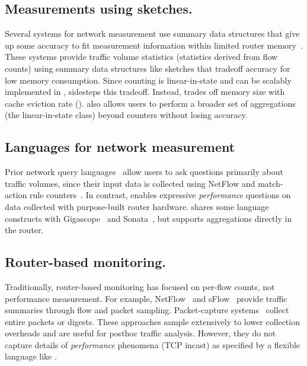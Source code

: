 \subsection{Measurements using sketches.} Several systems for network
measurement use summary data structures that give up some accuracy to fit
measurement information within limited router memory~\cite{univmon, flowradar,
counterbraids, dream, progme, opensketch}. These systems provide traffic volume
statistics (\ie statistics derived from flow counts) using summary data
structures like sketches that tradeoff accuracy for low memory consumption.
Since counting is linear-in-state and can be scalably implemented in
\TheSystem, \TheSystem sidesteps this tradeoff. Instead, \TheSystem trades off
memory size with cache eviction rate ().  \TheSystem also allows
users to perform a broader set of aggregations (the linear-in-state class)
beyond counters without losing accuracy.

\subsection{Languages for network measurement} Prior network query
languages~\cite{gigascope, frenetic, path_query, streaming-monitoring} allow
users to ask questions primarily about traffic volumes, since their input data
is collected using NetFlow and match-action rule counters~\cite{openflow}. In
contrast, \TheSystem enables expressive {\em performance} questions on data
collected with purpose-built router hardware. \TheSystem shares some language
constructs with Gigascope~\cite{gigascope} and
Sonata~\cite{streaming-monitoring}, but supports aggregations directly in the
router.

\subsection{Router-based monitoring.} Traditionally, router-based monitoring
has focused on per-flow counts, not performance measurement. For example,
NetFlow~\cite{netflow} and sFlow~\cite{sflow} provide traffic summaries through
flow and packet sampling. Packet-capture systems~\cite{cisco-span, niksun,
netsight, everflow, pathdump, path_query} collect entire packets or digests.
These approaches sample extensively to lower collection overheads and are
useful for posthoc traffic analysis. However, they do not capture details of
{\em performance} phenomena (\eg TCP incast) as specified by a flexible
language like \TheSystem.

